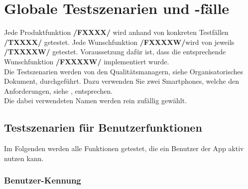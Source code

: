 \section{Globale Testszenarien und -fälle}
	
	Jede Produktfunktion \textbf{/FXXXX/} wird anhand von konkreten Testfällen \textbf{/TXXXX/} getestet. 	
Jede Wunschfunktion \textbf{/FXXXXW/}wird von jeweils \textbf{/TXXXXW/} getestet. 
Voraussetzung dafür ist, dass die entsprechende Wunschfunktion \textbf{/FXXXXW/} implementiert wurde. \\
Die Testszenarien werden von den Qualitätsmanagern, siehe Organisatorisches Dokument, durchgeführt. Dazu verwenden Sie zwei Smartphones, welche den Anforderungen, siehe , entsprechen.\\
Die dabei verwendeten Namen werden rein zufällig gewählt.

	
	\subsection{Testszenarien für Benutzerfunktionen}

Im Folgenden werden alle Funktionen getestet, die ein Benutzer der App aktiv nutzen kann.

		\subsubsection{Benutzer-Kennung}

